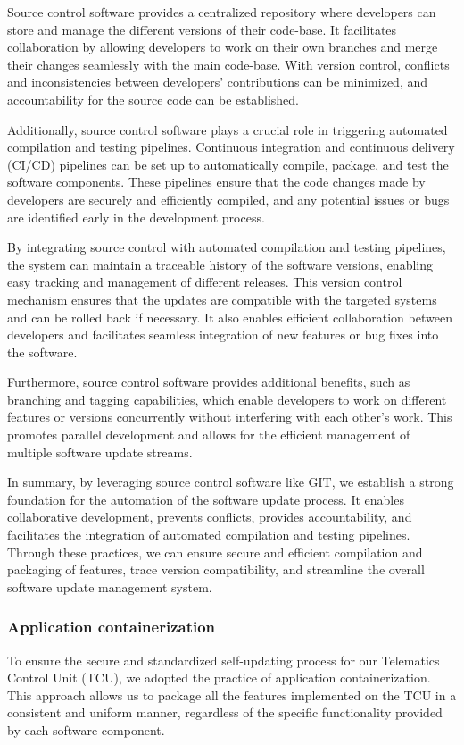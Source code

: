 \documentclass[
12pt,
oneside, 
onehalfspacing, 
nolistspacing, 
parskip, 
chapterinoneline, 
]{AASTCOMPUTER}
\begin{document}
Source control software provides a centralized repository where developers can store and manage the different versions of their code-base. It facilitates collaboration by allowing developers to work on their own branches and merge their changes seamlessly with the main code-base. With version control, conflicts and inconsistencies between developers' contributions can be minimized, and accountability for the source code can be established.

Additionally, source control software plays a crucial role in triggering automated compilation and testing pipelines. Continuous integration and continuous delivery (CI/CD) pipelines can be set up to automatically compile, package, and test the software components. These pipelines ensure that the code changes made by developers are securely and efficiently compiled, and any potential issues or bugs are identified early in the development process.

By integrating source control with automated compilation and testing pipelines, the system can maintain a traceable history of the software versions, enabling easy tracking and management of different releases. This version control mechanism ensures that the updates are compatible with the targeted systems and can be rolled back if necessary. It also enables efficient collaboration between developers and facilitates seamless integration of new features or bug fixes into the software.

Furthermore, source control software provides additional benefits, such as branching and tagging capabilities, which enable developers to work on different features or versions concurrently without interfering with each other's work. This promotes parallel development and allows for the efficient management of multiple software update streams.

In summary, by leveraging source control software like GIT, we establish a strong foundation for the automation of the software update process. It enables collaborative development, prevents conflicts, provides accountability, and facilitates the integration of automated compilation and testing pipelines. Through these practices, we can ensure secure and efficient compilation and packaging of features, trace version compatibility, and streamline the overall software update management system.

\subsubsection{Application containerization}
To ensure the secure and standardized self-updating process for our Telematics Control Unit (TCU), we adopted the practice of application containerization. This approach allows us to package all the features implemented on the TCU in a consistent and uniform manner, regardless of the specific functionality provided by each software component.
\end{document}
